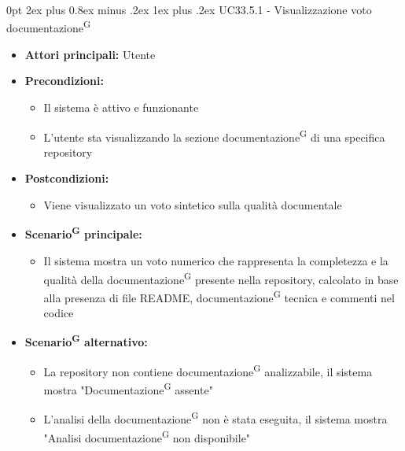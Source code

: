 \documentclass[a4paper, 11pt]{article}
\makeatletter
\renewcommand\subparagraph{\@startsection{subparagraph}{5}
  {0pt}
  {2ex plus 0.8ex minus .2ex}
  {1ex plus .2ex}
  {\normalfont\normalsize\bfseries\color{AccentColor}}}
\makeatother
\begin{document}
\subparagraph{UC33.5.1 - Visualizzazione voto documentazione\textsuperscript{G}}\label{UC33.5.1}
\begin{itemize}
    \item \textbf{Attori principali:} Utente 
    \item \textbf{Precondizioni:} 
    \begin{itemize}
        \item Il sistema è attivo e funzionante
        \item L'utente sta visualizzando la sezione documentazione\textsuperscript{G} di una specifica repository
    \end{itemize}
    \item \textbf{Postcondizioni:} 
    \begin{itemize}
        \item Viene visualizzato un voto sintetico sulla qualità documentale
    \end{itemize}
    \item \textbf{Scenario\textsuperscript{G} principale:}
    \begin{itemize}
        \item Il sistema mostra un voto numerico che rappresenta la completezza e la qualità della documentazione\textsuperscript{G} presente nella repository, calcolato in base alla presenza di file README, documentazione\textsuperscript{G} tecnica e commenti nel codice
    \end{itemize}
    \item \textbf{Scenario\textsuperscript{G} alternativo:}
    \begin{itemize}
        \item La repository non contiene documentazione\textsuperscript{G} analizzabile, il sistema mostra "Documentazione\textsuperscript{G} assente"
        \item L'analisi della documentazione\textsuperscript{G} non è stata eseguita, il sistema mostra "Analisi documentazione\textsuperscript{G} non disponibile"
    \end{itemize}
\end{itemize}
\end{document}
